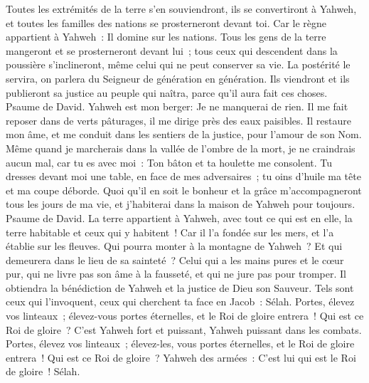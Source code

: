 \begin{multicols}{2}
Toutes les extrémités de la terre s'en souviendront, ils se convertiront à Yahweh, et toutes les familles des nations se prosterneront devant toi.
Car le règne appartient à Yahweh~: Il domine sur les nations.
Tous les gens de la terre mangeront et se prosterneront devant lui~; tous ceux qui descendent dans la poussière s'inclineront, même celui qui ne peut conserver sa vie.
La postérité le servira, on parlera du Seigneur de génération en génération.
Ils viendront et ils publieront sa justice au peuple qui naîtra, parce qu'il aura fait ces choses.
\VerseOne{}Psaume de David. Yahweh est mon berger: Je ne manquerai de rien.
Il me fait reposer dans de verts pâturages, il me dirige près des eaux paisibles.
Il restaure mon âme, et me conduit dans les sentiers de la justice, pour l'amour de son Nom.
Même quand je marcherais dans la vallée de l'ombre de la mort, je ne craindrais aucun mal, car tu es avec moi~: Ton bâton et ta houlette me consolent.
Tu dresses devant moi une table, en face de mes adversaires~; tu oins d'huile ma tête et ma coupe déborde.
Quoi qu'il en soit le bonheur et la grâce m'accompagneront tous les jours de ma vie, et j'habiterai dans la maison de Yahweh pour toujours.
\VerseOne{}Psaume de David. La terre appartient à Yahweh, avec tout ce qui est en elle, la terre habitable et ceux qui y habitent~!
Car il l'a fondée sur les mers, et l'a établie sur les fleuves.
Qui pourra monter à la montagne de Yahweh~? Et qui demeurera dans le lieu de sa sainteté~?
Celui qui a les mains pures et le cœur pur, qui ne livre pas son âme à la fausseté, et qui ne jure pas pour tromper.
Il obtiendra la bénédiction de Yahweh et la justice de Dieu son Sauveur.
Tels sont ceux qui l'invoquent, ceux qui cherchent ta face en Jacob~: Sélah.
Portes, élevez vos linteaux~; élevez-vous portes éternelles, et le Roi de gloire entrera~!
Qui est ce Roi de gloire~? C'est Yahweh fort et puissant, Yahweh puissant dans les combats.
Portes, élevez vos linteaux~; élevez-les, vous portes éternelles, et le Roi de gloire entrera~!
Qui est ce Roi de gloire~? Yahweh des armées~: C'est lui qui est le Roi de gloire~! Sélah.

\end{multicols}
